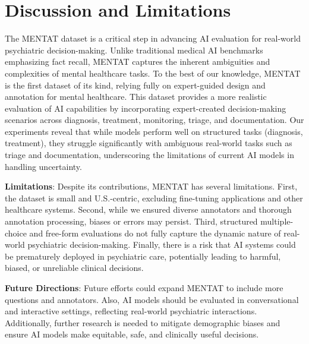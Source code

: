 
\section{Discussion and Limitations}
\label{sec:5_discussion}

The MENTAT dataset is a critical step in advancing AI evaluation for real-world psychiatric decision-making. Unlike traditional medical AI benchmarks emphasizing fact recall, MENTAT captures the inherent ambiguities and complexities of mental healthcare tasks. 
To the best of our knowledge, MENTAT is the first dataset of its kind, relying fully on expert-guided design and annotation for mental healthcare.
This dataset provides a more realistic evaluation of AI capabilities by incorporating expert-created decision-making scenarios across diagnosis, treatment, monitoring, triage, and documentation. Our experiments reveal that while models perform well on structured tasks (diagnosis, treatment), they struggle significantly with ambiguous real-world tasks such as triage and documentation, underscoring the limitations of current AI models in handling uncertainty.

\textbf{Limitations}: Despite its contributions, MENTAT has several limitations. First, the dataset is small and U.S.-centric, excluding fine-tuning applications and other healthcare systems. Second, while we ensured diverse annotators and thorough annotation processing, biases or errors may persist. Third, structured multiple-choice and free-form evaluations do not fully capture the dynamic nature of real-world psychiatric decision-making. Finally, there is a risk that AI systems could be prematurely deployed in psychiatric care, potentially leading to harmful, biased, or unreliable clinical decisions.

\textbf{Future Directions}: Future efforts could expand MENTAT to include more questions and annotators. Also, AI models should be evaluated in conversational and interactive settings, reflecting real-world psychiatric interactions. Additionally, further research is needed to mitigate demographic biases and ensure AI models make equitable, safe, and clinically useful decisions.